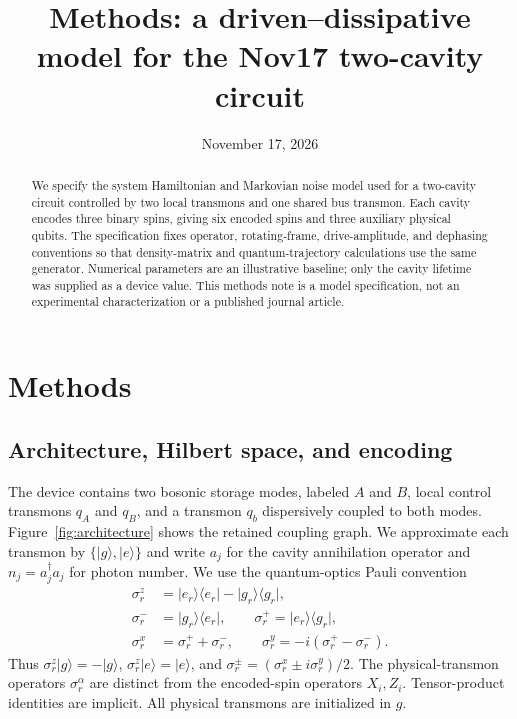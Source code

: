 \documentclass[aps,prb,reprint,amsmath,amssymb,nofootinbib]{revtex4-2}
\newcommand{\ket}[1]{\lvert#1\rangle}
\newcommand{\bra}[1]{\langle#1\rvert}
\begin{document}
\title{Methods: a driven--dissipative model for the Nov17 two-cavity circuit}
\date{November 17, 2026}
\begin{abstract}
We specify the system Hamiltonian and Markovian noise model used for a
two-cavity circuit controlled by two local transmons and one shared bus
transmon. Each cavity encodes three binary spins, giving six encoded spins
and three auxiliary physical qubits. The specification fixes operator,
rotating-frame, drive-amplitude, and dephasing conventions so that
density-matrix and quantum-trajectory calculations use the same generator.
Numerical parameters are an illustrative baseline; only the cavity lifetime
was supplied as a device value. This methods note is a model specification,
not an experimental characterization or a published journal article.
\end{abstract}
\maketitle

\section{Methods}
\subsection{Architecture, Hilbert space, and encoding}

The device contains two bosonic storage modes, labeled $A$ and $B$, local
control transmons $q_A$ and $q_B$, and a transmon $q_b$ dispersively coupled
to both modes. Figure~\ref{fig:architecture} shows the retained coupling
graph. We approximate each transmon by $\{\ket{g},\ket{e}\}$ and write
$a_j$ for the cavity annihilation operator and $n_j=a_j^\dagger a_j$ for
photon number. We use the quantum-optics Pauli convention
\begin{align}
 \sigma_r^z&=\ket{e_r}\bra{e_r}-\ket{g_r}\bra{g_r},\\
 \sigma_r^-&=\ket{g_r}\bra{e_r},\qquad
 \sigma_r^+=\ket{e_r}\bra{g_r},\\
 \sigma_r^x&=\sigma_r^++\sigma_r^-,\qquad
 \sigma_r^y=-i(\sigma_r^+-\sigma_r^-).
\end{align}
Thus $\sigma_r^z\ket g=-\ket g$, $\sigma_r^z\ket e=\ket e$, and
$\sigma_r^\pm=(\sigma_r^x\pm i\sigma_r^y)/2$.
The physical-transmon operators $\sigma_r^\alpha$ are distinct from the
encoded-spin operators $X_i,Z_i$. Tensor-product identities are implicit.
All physical transmons are initialized in $g$.
\end{document}
